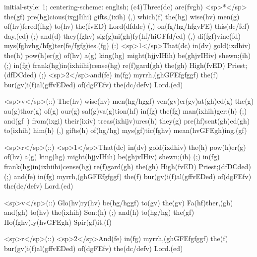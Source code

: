 initial-style: 1;
centering-scheme: english;
(c4)Three(dc) are(fvgh) <sp>*</sp> the(gf) pre(hg)cious(ixgjIihi) gifts,(ixih) (,) which(f) the(hg) wise(hv) men(g) of(hv)fered(fhg) to(hv) the(fvED) Lord(dfddc) (,) on(fg/hg/hfgvFE) this(de/fef) day,(ed) (;) and(d) they(fghv) sig(g)ni(gh)fy(hf/hiGFfd/ed) (,) di(fgf)vine(fd) mys(fghvhg/hfg)ter(fe/fgfg)ies.(fg) (:) <sp>1</sp>That(dc) in(dv) gold(ixdhiv) the(h) pow(h)er(g) of(hv) a(g) king(hg) might(hjjvIHih) be(ghjvIHiv) shewn;(ih) (;) in(fg) frank(hg)in(ixhiihi)cense(hg) re(f)gard(gh) the(gh) High(fvED) Priest;(dfDCded) (;) <sp>2</sp>and(fe) in(fg) myrrh,(ghGFEfgfggf) the(f) bur(gv)i(f)al(gffvEDed) of(dgFEfv) the(dc/defv) Lord.(ed)

<sp>v</sp>(::) The(hv) wise(hv) men(hg/hggf) ven(gv)er(gv)at(gh)ed(g) the(g) au(g)thor(g) of(g) our(g) sal(g)va(g)tion(hf) in(fg) the(fg) man(ixhih)ger:(h) (;) and(gf~) from(ixgi) their(ixiv) treas(ixhijv)ures(h) they(g) pre(hf)sent(gh)ed(gh) to(ixhih) him(h) (,) gifts(h) of(hg/hg) mys(gf)tic(fghv) mean(hvGFEgh)ing.(gf)

<sp>r</sp>(::) <sp>1</sp>That(dc) in(dv) gold(ixdhiv) the(h) pow(h)er(g) of(hv) a(g) king(hg) might(hjjvIHih) be(ghjvIHiv) shewn;(ih) (;) in(fg) frank(hg)in(ixhiihi)cense(hg) re(f)gard(gh) the(gh) High(fvED) Priest;(dfDCded) (;) and(fe) in(fg) myrrh,(ghGFEfgfggf) the(f) bur(gv)i(f)al(gffvEDed) of(dgFEfv) the(dc/defv) Lord.(ed)

<sp>v</sp>(::) Glo(hv)ry(hv) be(hg/hggf) to(gv) the(gv) Fa(hf)ther,(gh) and(gh) to(hv) the(ixhih) Son:(h) (;) and(h) to(hg/hg) the(gf) Ho(fghv)ly(hvGFEgh) Spir(gf)it.(f)

<sp>r</sp>(::) <sp>2</sp>And(fe) in(fg) myrrh,(ghGFEfgfggf) the(f) bur(gv)i(f)al(gffvEDed) of(dgFEfv) the(dc/defv) Lord.(ed)